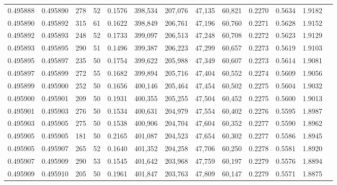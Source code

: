 \begin{tabular}{rrrrrrrrrrrrr}
0.495888 & 0.495890 &   278 &  52 &                                     0.1576 & 398,534 & 207,076 &  47,135 &  60,821 & 0.2270 & 0.5634 & 1.9182 \\
0.495890 & 0.495892 &   315 &  61 &                                     0.1622 & 398,849 & 206,761 &  47,196 &  60,760 & 0.2271 & 0.5628 & 1.9152 \\
0.495892 & 0.495893 &   248 &  52 &                                     0.1733 & 399,097 & 206,513 &  47,248 &  60,708 & 0.2272 & 0.5623 & 1.9129 \\
0.495893 & 0.495895 &   290 &  51 &                                     0.1496 & 399,387 & 206,223 &  47,299 &  60,657 & 0.2273 & 0.5619 & 1.9103 \\
0.495895 & 0.495897 &   235 &  50 &                                     0.1754 & 399,622 & 205,988 &  47,349 &  60,607 & 0.2273 & 0.5614 & 1.9081 \\
0.495897 & 0.495899 &   272 &  55 &                                     0.1682 & 399,894 & 205,716 &  47,404 &  60,552 & 0.2274 & 0.5609 & 1.9056 \\
0.495899 & 0.495900 &   252 &  50 &                                     0.1656 & 400,146 & 205,464 &  47,454 &  60,502 & 0.2275 & 0.5604 & 1.9032 \\
0.495900 & 0.495901 &   209 &  50 &                                     0.1931 & 400,355 & 205,255 &  47,504 &  60,452 & 0.2275 & 0.5600 & 1.9013 \\
0.495901 & 0.495903 &   276 &  50 &                                     0.1534 & 400,631 & 204,979 &  47,554 &  60,402 & 0.2276 & 0.5595 & 1.8987 \\
0.495903 & 0.495905 &   275 &  50 &                                     0.1538 & 400,906 & 204,704 &  47,604 &  60,352 & 0.2277 & 0.5590 & 1.8962 \\
0.495905 & 0.495905 &   181 &  50 &                                     0.2165 & 401,087 & 204,523 &  47,654 &  60,302 & 0.2277 & 0.5586 & 1.8945 \\
0.495905 & 0.495907 &   265 &  52 &                                     0.1640 & 401,352 & 204,258 &  47,706 &  60,250 & 0.2278 & 0.5581 & 1.8920 \\
0.495907 & 0.495909 &   290 &  53 &                                     0.1545 & 401,642 & 203,968 &  47,759 &  60,197 & 0.2279 & 0.5576 & 1.8894 \\
0.495909 & 0.495910 &   205 &  50 &                                     0.1961 & 401,847 & 203,763 &  47,809 &  60,147 & 0.2279 & 0.5571 & 1.8875 \\

\end{tabular}
